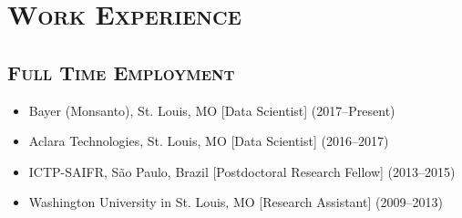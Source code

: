 \documentclass[10pt,a4paper]{moderncv}
\begin{document}
\section{\textsc{Work Experience}}
\subsection{\textsc{Full Time Employment}}

\begin{itemize}
\item Bayer (Monsanto), St. Louis, MO [Data Scientist] (2017--Present)
\item Aclara Technologies, St. Louis, MO [Data Scientist] (2016--2017)
\item ICTP-SAIFR, S\~{a}o Paulo, Brazil [Postdoctoral Research Fellow] (2013--2015)
\item Washington University in St. Louis, MO [Research Assistant] (2009--2013)
\end{itemize}


\end{document}
